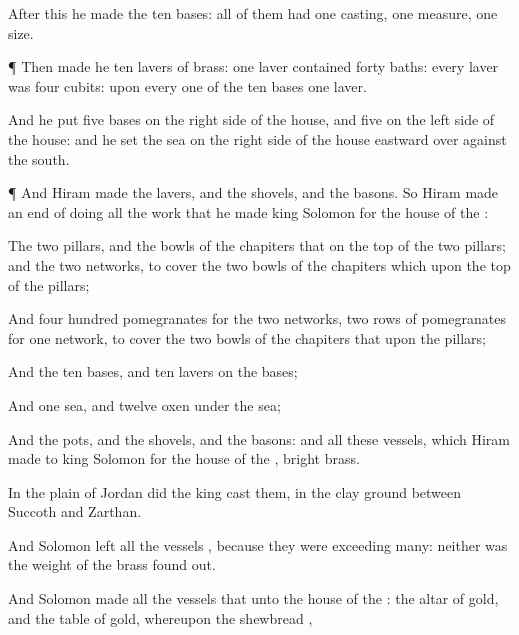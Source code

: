 {After this
{} he
made the
ten
bases: all of them had
one
casting,
one
measure,
{}
one
size.


\par }{\PP {}¶ Then
made he
ten
lavers of
brass:
one
laver
contained
forty
baths:
{}
every
laver was
four
cubits:
{} upon every
one of the
ten
bases
one
laver.

And he
put
five
bases on the
right
side of the
house, and
five on the
left
side of the
house: and he
set the
sea on the
right
side of the
house
eastward over
against the
south.


\par }{\PP {}¶ And
Hiram
made the
lavers, and the
shovels, and the
basons. So
Hiram
made an end of
doing all the
work that he
made
king
Solomon for the
house of the
{}:

The
two
pillars, and the
{}
bowls of the
chapiters that
{} on the
top of the
two
pillars; and the
two
networks, to
cover the
two
bowls of the
chapiters which
{} upon the
top of the
pillars;

And
four
hundred
pomegranates for the
two
networks,
{}
two
rows of
pomegranates for
one
network, to
cover the
two
bowls of the
chapiters that
{}
upon the
pillars;

And the
ten
bases, and
ten
lavers on the
bases;

And
one
sea, and
twelve
oxen under the
sea;

And the
pots, and the
shovels, and the
basons: and all these
vessels, which
Hiram
made to
king
Solomon for the
house of the
{},
{}
bright
brass.

In the
plain of
Jordan did the
king
cast them, in the
clay
ground between
Succoth and
Zarthan.

And
Solomon
left all the
vessels
{}, because they were
exceeding
many: neither was the
weight of the
brass found
out.


\par }{\PP {}And
Solomon
made all the
vessels that
{} unto the
house of the
{}: the
altar of
gold, and the
table of
gold, whereupon the
shewbread
{},

}
